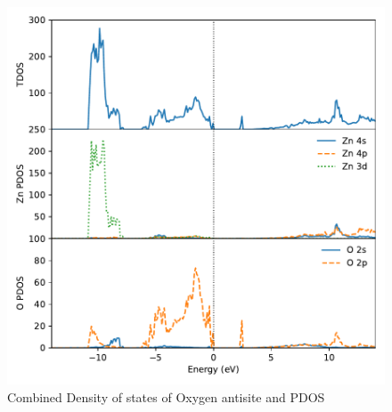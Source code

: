 \begin{figure}[tbh!]
	\centering
	\includegraphics[width=0.7\linewidth]{"images/dos-pdos_O-antisite"}
	\caption[Combined Density of states of Oxygen antisite and PDOS]{Combined Density of states of Oxygen antisite and PDOS}
\end{figure}





